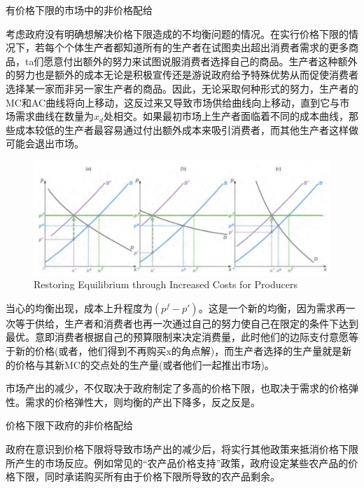 \documentclass{article}
\begin{document}
\hspace*{\fill}

有价格下限的市场中的非价格配给

考虑政府没有明确想解决价格下限造成的不均衡问题的情况。在实行价格下限的情况下，若每个个体生产者都知道所有的生产者在试图卖出超出消费者需求的更多商品，ta们愿意付出额外的努力来试图说服消费者选择自己的商品。生产者这种额外的努力也是额外的成本无论是积极宣传还是游说政府给予特殊优势从而促使消费者选择某一家而非另一家生产者的商品。因此，无论采取何种形式的努力，生产者的MC和AC曲线将向上移动，这反过来又导致市场供给曲线向上移动，直到它与市场需求曲线在数量为$ x_d $处相交。如果最初市场上生产者面临着不同的成本曲线，那些成本较低的生产者最容易通过付出额外成本来吸引消费者，而其他生产者这样做可能会退出市场。

\begin{figure}[H] %
	\centering %
	\includegraphics[width=1\textwidth]{18_5} %
	\caption{Restoring Equilibrium through Increased Costs for Producers} %
	\label{Fig.main6} %
\end{figure}

当心的均衡出现，成本上升程度为$ (p^f-p') $。这是一个新的均衡，因为需求再一次等于供给，生产者和消费者也再一次通过自己的努力使自己在限定的条件下达到最优。意即消费者根据自己的预算限制来决定消费量，此时他们的边际支付意愿等于新的价格(或者，他们得到不再购买x的角点解)，而生产者选择的生产量就是新的价格与其新MC的交点处的生产量(或者他们一起推出市场)。

市场产出的减少，不仅取决于政府制定了多高的价格下限，也取决于需求的价格弹性。需求的价格弹性大，则均衡的产出下降多，反之反是。

\hspace*{\fill}

价格下限下政府的非价格配给

政府在意识到价格下限将导致市场产出的减少后，将实行其他政策来抵消价格下限所产生的市场反应。例如常见的“农产品价格支持”政策，政府设定某些农产品的价格下限，同时承诺购买所有由于价格下限所导致的农产品剩余。
\end{document}
